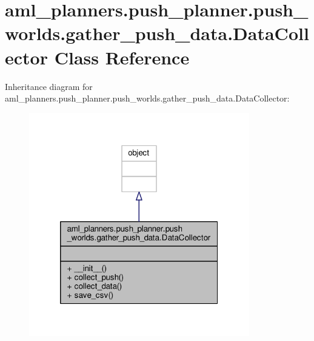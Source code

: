 \hypertarget{classaml__planners_1_1push__planner_1_1push__worlds_1_1gather__push__data_1_1_data_collector}{\section{aml\-\_\-planners.\-push\-\_\-planner.\-push\-\_\-worlds.\-gather\-\_\-push\-\_\-data.\-Data\-Collector Class Reference}
\label{classaml__planners_1_1push__planner_1_1push__worlds_1_1gather__push__data_1_1_data_collector}
}


Inheritance diagram for aml\-\_\-planners.\-push\-\_\-planner.\-push\-\_\-worlds.\-gather\-\_\-push\-\_\-data.\-Data\-Collector\-:\nopagebreak
\begin{figure}[H]
\begin{center}
\leavevmode
\includegraphics[width=272pt]{classaml__planners_1_1push__planner_1_1push__worlds_1_1gather__push__data_1_1_data_collector__inherit__graph}
\end{center}
\end{figure}


